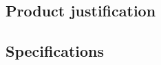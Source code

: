 \documentclass[../main.tex]{subfiles}
\begin{document}
    \subsection{Product justification}

    \subsection{Specifications}
\end{document}
